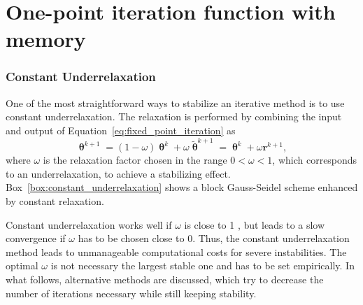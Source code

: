 \section{One-point iteration function with memory}


\subsubsection{Constant Underrelaxation}

One of the most straightforward ways to stabilize an iterative method is to use constant underrelaxation.
The relaxation is performed by combining the input and output of Equation~\eqref{eq:fixed_point_iteration} as
\begin{equation} \label{eq:constant_relaxation}
\bm \uptheta^{k+1}=(1-\omega) \bm\uptheta^{k}+\omega \tilde{\bm\uptheta}^{k+1}=\bm\uptheta^{k}+\omega \mathbf{r}^{k+1},
\end{equation}
where \(\omega\) is the relaxation factor chosen in the range \(0<\omega<1\), which corresponds to an underrelaxation, to achieve a stabilizing effect.
Box~\ref{box:constant_underrelaxation} shows a block Gauss-Seidel scheme enhanced by constant relaxation.

Constant underrelaxation works well if \(\omega\) is close to 1 , but leads to a slow convergence if \(\omega\) has to be chosen close to 0.
Thus, the constant underrelaxation method leads to unmanageable computational costs for severe instabilities.
The optimal \(\omega\) is not necessary the largest stable one \citet{gatzhammer_efficient_2014} and has to be set empirically.
In what follows, alternative methods are discussed, which try to decrease the number of iterations necessary while still keeping stability.

